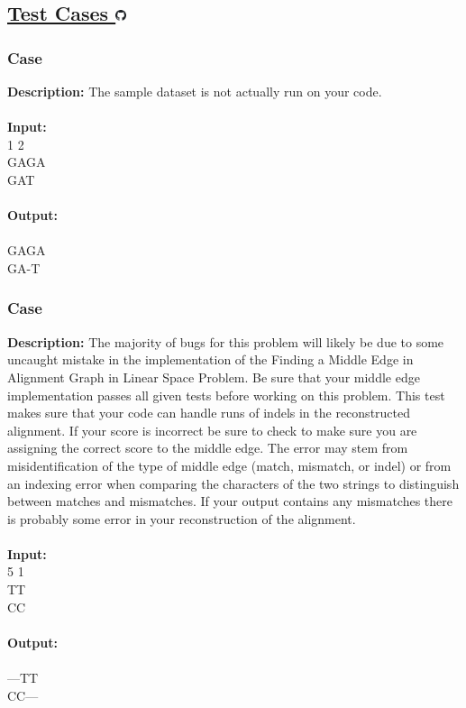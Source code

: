 \documentclass{article}
\newcommand{\code}[1]{{\fontfamily{pcr}\selectfont #1}}
\newcommand{\gitlogo}{\includegraphics[height=12.5]{c0/gitlogo.png}}
\begin{document}
\subsection*{\href{https://github.com/rjeveloff/BA_problemregister/tree/main/test_cases/chapter_5/5L}{Test Cases \gitlogo}}
\subsubsection*{Case }
\hline \vspace{5}
\textbf{Description:} The sample dataset is not actually run on your code.\\ \\
\noindent \textbf{Input:}\\
\code{1 1 2\\GAGA\\GAT}\\ \\
\noindent \textbf{Output:}\\
\code{-1\\GAGA\\GA-T}

\subsubsection*{Case }
\hline \vspace{5}
\textbf{Description:} The majority of bugs for this problem will likely be due to some uncaught mistake in the implementation of the Finding a Middle Edge in Alignment Graph in Linear Space Problem. Be sure that your middle edge implementation passes all given tests before working on this problem. This test makes sure that your code can handle runs of indels in the reconstructed alignment. If your score is incorrect be sure to check to make sure you are assigning the correct score to the middle edge. The error may stem from misidentification of the type of middle edge (match, mismatch, or indel) or from an indexing error when comparing the characters of the two strings to distinguish between matches and mismatches. If your output contains any mismatches there is probably some error in your reconstruction of the alignment.\\ \\
\noindent \textbf{Input:}\\
\code{1 5 1\\TT\\CC}\\ \\
\noindent \textbf{Output:}\\
\code{-4\\---TT\\CC---}
\pagebreak
\end{document}
